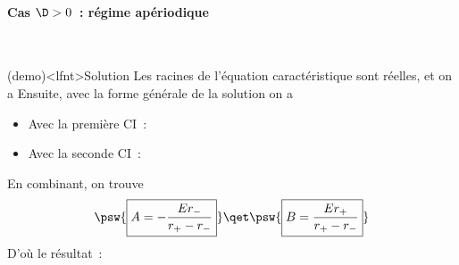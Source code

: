 \documentclass[../../main/main.tex]{subfiles}
\begin{document}
\paragraph{Cas $\D > 0$~: régime apériodique}
~\smallbreak
\begin{tcb}[label=demo:solupseudoper, sidebyside](demo)<lfnt>{Solution}
	Les racines de l'équation caractéristique sont réelles, et on a
	Ensuite, avec la forme générale de la solution on a
	\vspace{-15pt}
	\tcblower
	\begin{itemize}
		\item Avec la première CI~:
		      \vspace{-15pt}
		\item Avec la seconde CI~:
		      \vspace{-15pt}
	\end{itemize}
	En combinant, on trouve
	\begin{equation*}
		\psw{
			\boxed{A = - \frac{Er_-}{r_+ - r_-}}
		}
		\qet
		\psw{
			\boxed{B = \frac{Er_+}{r_+ - r_-}
			}
		}
	\end{equation*}
	D'où le résultat~:
\end{tcb}
\end{document}

